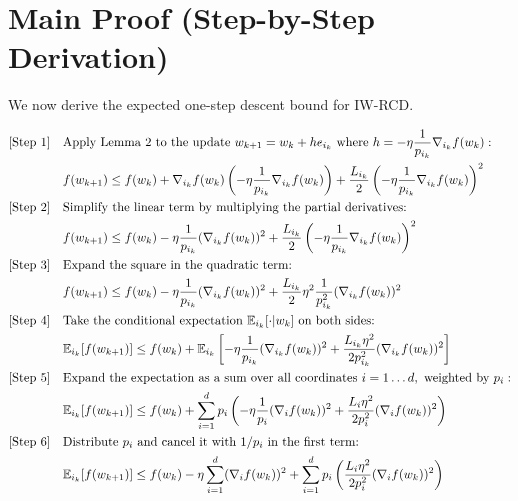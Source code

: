 \documentclass{article}
\begin{document}
\section*{Main Proof (Step-by-Step Derivation)}

We now derive the expected one-step descent bound for IW-RCD. 

\begin{align}
    \text{[Step 1]} \quad & \text{Apply Lemma 2 to the update } w_{k+1} = w_k + h e_{i_k} \text{ where } h = -\eta \frac{1}{p_{i_k}} \nabla_{i_k} f(w_k): \notag \\
    & f(w_{k+1}) \leq f(w_k) + \nabla_{i_k} f(w_k) \left(-\eta \frac{1}{p_{i_k}} \nabla_{i_k} f(w_k)\right) + \frac{L_{i_k}}{2} \left(-\eta \frac{1}{p_{i_k}} \nabla_{i_k} f(w_k)\right)^2 \\
    \text{[Step 2]} \quad & \text{Simplify the linear term by multiplying the partial derivatives:} \notag \\
    & f(w_{k+1}) \leq f(w_k) - \eta \frac{1}{p_{i_k}} (\nabla_{i_k} f(w_k))^2 + \frac{L_{i_k}}{2} \left(-\eta \frac{1}{p_{i_k}} \nabla_{i_k} f(w_k)\right)^2 \\
    \text{[Step 3]} \quad & \text{Expand the square in the quadratic term:} \notag \\
    & f(w_{k+1}) \leq f(w_k) - \eta \frac{1}{p_{i_k}} (\nabla_{i_k} f(w_k))^2 + \frac{L_{i_k}}{2} \eta^2 \frac{1}{p_{i_k}^2} (\nabla_{i_k} f(w_k))^2 \\
    \text{[Step 4]} \quad & \text{Take the conditional expectation } \mathbb{E}_{i_k}[\cdot | w_k] \text{ on both sides:} \notag \\
    & \mathbb{E}_{i_k}[f(w_{k+1})] \leq f(w_k) + \mathbb{E}_{i_k}\left[ - \eta \frac{1}{p_{i_k}} (\nabla_{i_k} f(w_k))^2 + \frac{L_{i_k} \eta^2}{2 p_{i_k}^2} (\nabla_{i_k} f(w_k))^2 \right] \\
    \text{[Step 5]} \quad & \text{Expand the expectation as a sum over all coordinates } i=1 \dots d, \text{ weighted by } p_i: \notag \\
    & \mathbb{E}_{i_k}[f(w_{k+1})] \leq f(w_k) + \sum_{i=1}^d p_i \left( - \eta \frac{1}{p_i} (\nabla_i f(w_k))^2 + \frac{L_i \eta^2}{2 p_i^2} (\nabla_i f(w_k))^2 \right) \\
    \text{[Step 6]} \quad & \text{Distribute } p_i \text{ and cancel it with } 1/p_i \text{ in the first term:} \notag \\
    & \mathbb{E}_{i_k}[f(w_{k+1})] \leq f(w_k) - \eta \sum_{i=1}^d (\nabla_i f(w_k))^2 + \sum_{i=1}^d p_i \left( \frac{L_i \eta^2}{2 p_i^2} (\nabla_i f(w_k))^2 \right) \\

\end{align}
\end{document}
